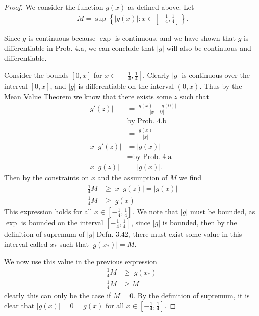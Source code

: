 \documentclass[12pt]{amsart}
\newcommand{\prob}[1]{Prob. #1}
\newcommand{\defn}[1]{Defn. #1}
\begin{document}
\begin{proof}
  We consider the function $g(x)$ as defined above. Let
  \begin{align*}
    M=\sup\left\{|g(x)|:x\in\left[-\frac{1}{4},\frac{1}{4}\right]\right\}.
  \end{align*}

  Since $g$ is continuous because $\exp$ is continuous, and we have shown that
  $g$ is differentiable in \prob{4.a}, we can conclude that $|g|$ will also be
  continuous and differentiable.

  Consider the bounds $\left[0, x\right]$ for $x\in\left[-\frac{1}{4},
  \frac{1}{4}\right]$. Clearly $|g|$ is continuous over the interval $[0,x]$,
  and $|g|$ is differentiable on the interval $(0,x)$. Thus by the Mean Value
  Theorem we know that there exists some $z$ such that
  \begin{align*}
    \left| g'(z)\right|&=\frac{|g(x)|-|g(0)|}{|x-0|}\\
                       &\text{by \prob{4.b}}\\
                       &=\frac{|g(x)|}{|x|}\\
             |x||g'(z)|&=|g(x)|\\
                       &=\text{by \prob{4.a}}\\
              |x||g(z)|&=|g(x)|.
  \end{align*}
  Then by the constraints on $x$ and the assumption of $M$ we find
  \begin{align*}
    \frac{1}{4}M&\geq|x||g(z)|=|g(x)|\\
    \frac{1}{4}M&\geq|g(x)|
  \end{align*}
  This expression holds for all $x\in\left[-\frac{1}{4},\frac{1}{4}\right]$. We
  note that $|g|$ must be bounded, as $\exp$ is bounded on the interval
  $\left[-\frac{1}{4},\frac{1}{4}\right]$, since $|g|$ is bounded, then by the
  definition of supremum of $|g|$ \defn{3.42}, there must exist some value in
  this interval called $x_*$ such that $|g(x_*)|=M$.

  We now use this value in the previous expression
  \begin{align*}
    \frac{1}{4}M&\geq|g(x_*)|\\
    \frac{1}{4}M&\geq M
  \end{align*}
  clearly this can only be the case if $M=0$. By the definition of supremum, it
  is clear that $|g(x)|=0=g(x)$ for all
  $x\in\left[-\frac{1}{4},\frac{1}{4}\right]$.
\end{proof}
\end{document}
